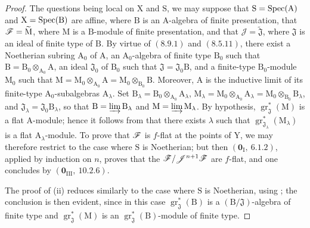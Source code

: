 \begin{proof}
The questions being local on $\mathrm{X}$ and $\mathrm{S}$, we may suppose that
$\mathrm{S}=\operatorname{Spec}(\mathrm{A})$ and $\mathrm{X}=\operatorname{Spec}(\mathrm{B})$ are affine,
where $\mathrm{B}$ is an $\mathrm{A}$-algebra of finite presentation, that
$\mathscr{F}=\widetilde{\mathrm{M}}$, where $\mathrm{M}$ is a
$\mathrm{B}$-module of finite presentation, and that
$\mathscr{J}=\widetilde{\mathfrak{J}}$, where $\mathfrak{J}$ is an ideal
of finite type of $\mathrm{B}$. By virtue of $(8.9.1)$ and $(8.5.11)$,
there exist a Noetherian subring $\mathrm{A}_0$ of $\mathrm{A}$, an
$\mathrm{A}_0$-algebra of finite type $\mathrm{B}_0$ such that
$\mathrm{B}=\mathrm{B}_0\otimes_{\mathrm{A}_0}\mathrm{A}$, an ideal
$\mathfrak{J}_0$ of $\mathrm{B}_0$ such that
$\mathfrak{J}=\mathfrak{J}_0\mathrm{B}$, and a finite-type
$\mathrm{B}_0$-module $\mathrm{M}_0$ such that
$\mathrm{M}=\mathrm{M}_0\otimes_{\mathrm{A}_0}\mathrm{A}
=\mathrm{M}_0\otimes_{\mathrm{B}_0}\mathrm{B}$. Moreover,
$\mathrm{A}$ is the inductive limit of its finite-type
$\mathrm{A}_0$-subalgebras $\mathrm{A}_\lambda$. Set
$\mathrm{B}_\lambda=\mathrm{B}_0\otimes_{\mathrm{A}_0}\mathrm{A}_\lambda$,
$\mathrm{M}_\lambda=\mathrm{M}_0\otimes_{\mathrm{A}_0}\mathrm{A}_\lambda
=\mathrm{M}_0\otimes_{\mathrm{B}_0}\mathrm{B}_\lambda$, and
$\mathfrak{J}_\lambda=\mathfrak{J}_0\mathrm{B}_\lambda$, so that
$\mathrm{B}=\varinjlim\mathrm{B}_\lambda$ and
$\mathrm{M}=\varinjlim\mathrm{M}_\lambda$. By hypothesis,
$\operatorname{gr}^*_\mathfrak{J}(\mathrm{M})$ is a flat
$\mathrm{A}$-module; hence it follows from  that there
exists $\lambda$ such that
$\operatorname{gr}^*_{\mathfrak{J}_\lambda}(\mathrm{M}_\lambda)$ is a
flat $\mathrm{A}_\lambda$-module. To prove that $\mathscr{F}$ is $f$-flat at
the points of $\mathrm{Y}$, we may therefore restrict to the case where
$\mathrm{S}$ is Noetherian; but then $(\mathbf{0}_\mathrm{I},~6.1.2)$,
applied by induction on $n$, proves that the
$\mathscr{F}/\mathscr{J}^{n+1}\mathscr{F}$ are $f$-flat, and one concludes by
$(\mathbf{0}_{\mathrm{III}},~10.2.6)$.

The proof of (ii) reduces similarly to the case where $\mathrm{S}$ is Noetherian, using ; the conclusion is then evident, since in this case $\operatorname{gr}^*_\mathfrak{J}(\mathrm{B})$ is a $(\mathrm{B}/\mathfrak{J})$-algebra of finite type and $\operatorname{gr}^*_\mathfrak{J}(\mathrm{M})$ is an $\operatorname{gr}^*_\mathfrak{J}(\mathrm{B})$-module of finite type.


\end{proof}

